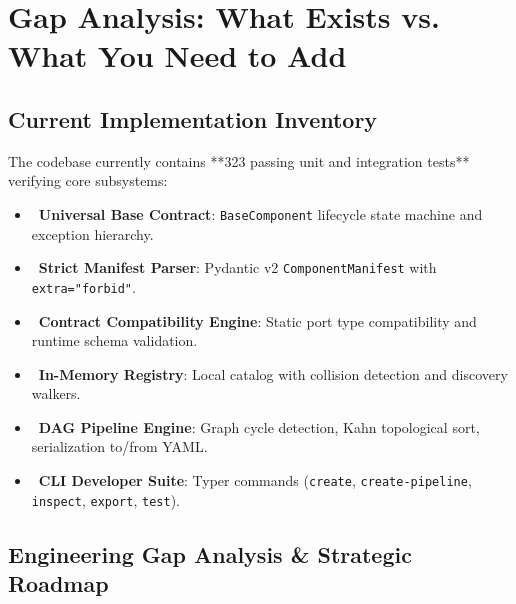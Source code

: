 \documentclass[11pt,a4paper]{article}
\begin{document}
\section{Gap Analysis: What Exists vs. What You Need to Add}

\subsection{Current Implementation Inventory}
The codebase currently contains **323 passing unit and integration tests** verifying core subsystems:
\begin{itemize}[leftmargin=1.5em, itemsep=2pt]
    \item \checkmark\ \textbf{Universal Base Contract}: \texttt{BaseComponent} lifecycle state machine and exception hierarchy.
    \item \checkmark\ \textbf{Strict Manifest Parser}: Pydantic v2 \texttt{ComponentManifest} with \texttt{extra="forbid"}.
    \item \checkmark\ \textbf{Contract Compatibility Engine}: Static port type compatibility and runtime schema validation.
    \item \checkmark\ \textbf{In-Memory Registry}: Local catalog with collision detection and discovery walkers.
    \item \checkmark\ \textbf{DAG Pipeline Engine}: Graph cycle detection, Kahn topological sort, serialization to/from YAML.
    \item \checkmark\ \textbf{CLI Developer Suite}: Typer commands (\texttt{create}, \texttt{create-pipeline}, \texttt{inspect}, \texttt{export}, \texttt{test}).
\end{itemize}

\subsection{Engineering Gap Analysis \& Strategic Roadmap}
\end{document}
